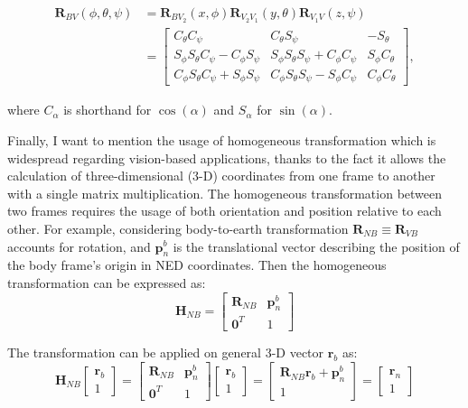 \begin{equation}
\begin{aligned}
    \mathbf{R}_{BV}(\phi,\theta,\psi)&=\mathbf{R}_{BV_2}(x,\phi)\mathbf{R}_{V_2V_1}(y,\theta)\mathbf{R}_{V_1V}(z,\psi) \\
    &=
    \begin{bmatrix}
        C_\theta C_\psi & C_\theta S_\psi & -S_\theta \\
        S_\phi S_\theta C_\psi - C_\phi S_\psi & S_\phi S_\theta S_\psi + C_\phi C_\psi & S_\phi C_\theta \\
        C_\phi S_\theta C_\psi + S_\phi S_\psi & C_\phi S_\theta S_\psi - S_\phi C_\psi & C_\phi C_\theta
    \end{bmatrix}, 
\end{aligned}
\label{eq:euler-angles}
\end{equation}

where $C_\alpha$ is shorthand for $\cos(\alpha)$ and $S_\alpha$ for $\sin(\alpha)$.

Finally, I want to mention the usage of homogeneous transformation which is widespread regarding vision-based applications, thanks to the fact it allows the calculation of three-dimensional (3-D) coordinates from one frame to another with a single matrix multiplication. The homogeneous transformation between two frames requires the usage of both orientation and position relative to each other. For example, considering body-to-earth transformation $\mathbf{R}_{NB}\equiv\mathbf{R}_{VB}$ accounts for rotation, and $\mathbf{p}_n^b$ is the translational vector describing the position of the body frame's origin in NED coordinates. Then the homogeneous transformation can be expressed as:
\begin{equation}
    \mathbf{H}_{NB}=\begin{bmatrix}
        \mathbf{R}_{NB} & \mathbf{p}_n^b \\
        \mathbf{0}^T & 1
    \end{bmatrix}
    \label{eq:hom-e2b}
\end{equation}

The transformation can be applied on general 3-D vector $\mathbf{r}_b$ as:
\begin{equation}
    \mathbf{H}_{NB}\begin{bmatrix}
        \mathbf{r}_b \\ 1
    \end{bmatrix}=\begin{bmatrix}
        \mathbf{R}_{NB} & \mathbf{p}_n^b\\
        \mathbf{0}^T & 1
    \end{bmatrix}\begin{bmatrix}
        \mathbf{r}_b \\ 1
    \end{bmatrix}=\begin{bmatrix}
    \mathbf{R}_{NB}\mathbf{r}_b+\mathbf{p}_n^b \\ 1
    \end{bmatrix} = \begin{bmatrix}
        \mathbf{r}_n \\ 1
    \end{bmatrix}
\end{equation}

